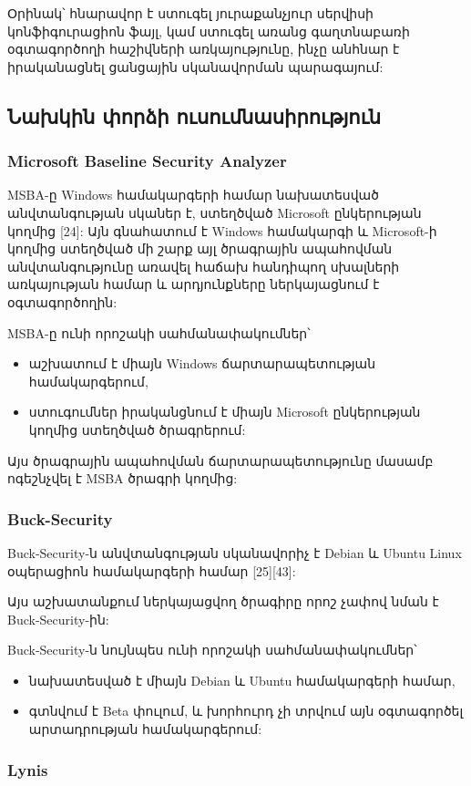 \documentclass[a4paper,12pt]{article}
\begin{document}
\begin{sloppypar}
Օրինակ՝ հնարավոր է ստուգել յուրաքանչյուր սերվիսի կոնֆիգուրացիոն ֆայլ,
կամ ստուգել առանց գաղտնաբառի օգտագործողի հաշիվների առկայությունը,
ինչը անհնար է իրականացնել ցանցային սկանավորման պարագայում:


\subsection{Նախկին փորձի ուսումնասիրություն}


\subsubsection{Microsoft Baseline Security Analyzer}


MSBA-ը Windows համակարգերի համար նախատեսված անվտանգության սկաներ է,
ստեղծված Microsoft ընկերության կողմից [24]: Այն գնահատում է Windows
համակարգի և Microsoft-ի կողմից ստեղծված մի շարք այլ ծրագրային ապահովման
անվտանգությունը առավել հաճախ հանդիպող սխալների առկայության համար և արդյունքները 
ներկայացնում է օգտագործողին:

MSBA-ը ունի որոշակի սահմանափակումներ՝
\begin{itemize}
\item աշխատում է միայն Windows ճարտարապետության համակարգերում,
\item ստուգումներ իրականցնում է միայն Microsoft ընկերության
	կողմից ստեղծված ծրագրերում:
\end{itemize}

Այս ծրագրային ապահովման ճարտարապետությունը մասամբ ոգեշնչվել է
MSBA ծրագրի կողմից:


\subsubsection{Buck-Security}


Buck-Security-ն անվտանգության սկանավորիչ է Debian և Ubuntu Linux
օպերացիոն համակարգերի համար [25][43]:

Այս աշխատանքում ներկայացվող ծրագիրը որոշ չափով նման է Buck-Security-ին:

Buck-Security-ն նույնպես ունի որոշակի սահմանափակումներ՝
\begin{itemize}
\item նախատեսված է միայն Debian և Ubuntu համակարգերի համար,
\item գտնվում է Beta փուլում, և խորհուրդ չի տրվում այն օգտագործել
	արտադրության համակարգերում:
\end{itemize}


\subsubsection{Lynis}



\end{sloppypar}
\end{document}
